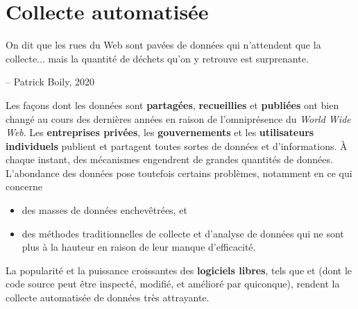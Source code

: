 \section{Collecte automatisée}
\begin{tcolorbox}[title=Les déchets des uns...]
On dit que les rues du Web sont pavées de données qui n'attendent que la collecte... mais la quantité de déchets qu'on y retrouve est surprenante. \\[-0.6cm]
\begin{flushright}
-- Patrick Boily, 2020
\end{flushright}
\end{tcolorbox}
\noindent Les façons dont les données sont \textbf{partagées}, \textbf{recueillies} et \textbf{publiées} ont bien changé au cours des dernières années en raison de l'omniprésence du \textit{World Wide Web}. Les \textbf{entreprises privées}, les \textbf{gouvernements} et les \textbf{utilisateurs individuels} publient et partagent toutes sortes de données et d'informations. À chaque instant, des mécanismes engendrent de grandes quantités de données.
\newl L'abondance des données pose toutefois certains problèmes, notamment en ce qui concerne 
\begin{itemize}[noitemsep]
\item des masses de données enchevêtrées, et 
\item des méthodes traditionnelles de collecte et d'analyse de données qui ne sont plus à la hauteur en raison de leur manque d'efficacité.
\end{itemize}
La popularité et la puissance croissantes des \textbf{logiciels libres}, tels que  et  (dont le code source peut être inspecté, modifié, et amélioré par quiconque), rendent la collecte automatisée de données très attrayante. 

